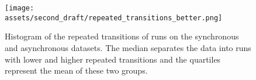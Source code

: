 \begin{figure}[t!]
    \centering
    \texttt{[image: assets/second\_draft/repeated\_transitions\_better.png]}
    \caption{Histogram of the repeated transitions of \gptfo{} \react{} runs on the synchronous and asynchronous datasets. The median separates the data into runs with lower and higher repeated transitions and the quartiles represent the mean of these two groups.}
    \label{fig:histogram_repeated_transitions}
\end{figure}